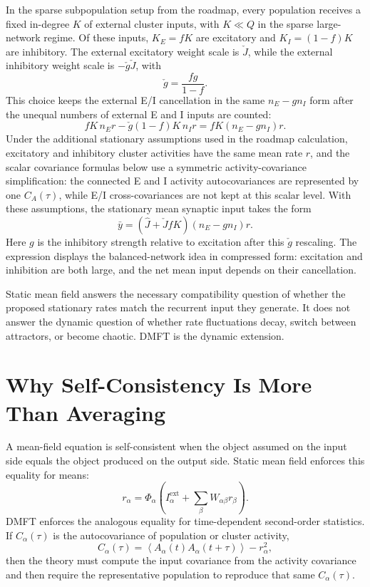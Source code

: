 In the sparse subpopulation setup from the roadmap, every population receives a
fixed in-degree \(K\) of external cluster inputs, with \(K\ll Q\) in the sparse
large-network regime. Of these inputs, \(K_E=fK\) are excitatory and
\(K_I=(1-f)K\) are inhibitory. The external excitatory weight scale is
\(\check J\), while the external inhibitory weight scale is
\(-\check g\check J\), with
\[
        \check g=\frac{fg}{1-f}.
        \label{eq:ch07-check-g-definition}
\]
This choice keeps the external E/I cancellation in the same \(n_E-g n_I\) form
after the unequal numbers of external E and I inputs are counted:
\[
        fK\,n_E r-\check g(1-f)K\,n_I r
        =
        fK\left(n_E-g n_I\right)r .
\]
Under the additional stationary assumptions used in the roadmap calculation,
excitatory and inhibitory cluster activities have the same mean rate \(r\), and
the scalar covariance formulas below use a symmetric activity-covariance
simplification: the connected E and I activity autocovariances are represented
by one \(C_A(\tau)\), while E/I cross-covariances are not kept at this scalar
level. With these assumptions, the stationary mean synaptic input takes the form
\[
        \bar{y}
        =
        \left(\widehat J+\check J fK\right)
        \left(n_E-g n_I\right)r .
        \label{eq:ch07-roadmap-stationary-input}
\]
Here \(g\) is the inhibitory strength relative to excitation after this
\(\check g\) rescaling. The expression displays the balanced-network idea in
compressed form: excitation and inhibition are both large, and the net mean
input depends on their cancellation.

Static mean field answers the necessary compatibility question of whether the
proposed stationary rates match the recurrent input they generate. It does not
answer the dynamic question of whether rate fluctuations decay, switch between
attractors, or become chaotic. DMFT is the dynamic extension.

\section{Why Self-Consistency Is More Than Averaging}
\label{sec:ch07-self-consistency}

A mean-field equation is self-consistent when the object assumed on the input
side equals the object produced on the output side. Static mean field enforces
this equality for means:
\[
        r_\alpha
        =
        \Phi_\alpha\!\left(
        I_\alpha^{\mathrm{ext}}+
        \sum_\beta W_{\alpha\beta}r_\beta
        \right).
        \label{eq:ch07-static-self-consistency}
\]
DMFT enforces the analogous equality for time-dependent second-order
statistics. If \(C_\alpha(\tau)\) is the autocovariance of population or cluster
activity,
\[
        C_\alpha(\tau)
        =
        \left\langle
        A_\alpha(t)A_\alpha(t+\tau)
        \right\rangle
        -
        r_\alpha^2,
        \label{eq:ch07-activity-autocovariance}
\]
then the theory must compute the input covariance from the activity covariance
and then require the representative population to reproduce that same
\(C_\alpha(\tau)\).

